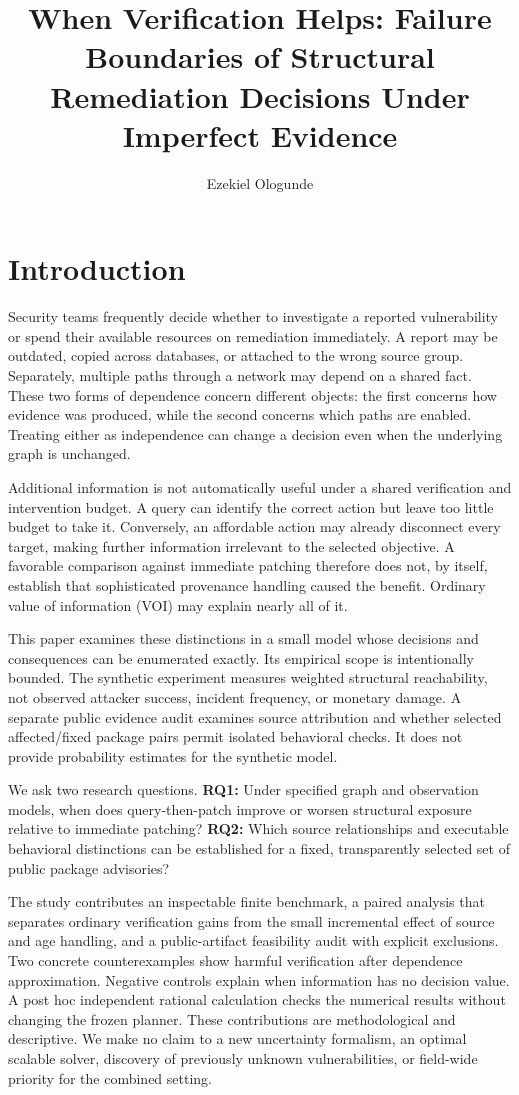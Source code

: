 \documentclass[manuscript,screen,nonacm]{acmart}
\title{When Verification Helps: Failure Boundaries of Structural Remediation Decisions Under Imperfect Evidence}
\author{Ezekiel Ologunde}
\affiliation[obeypunctuation=true]{\institution{Independent Researcher}\country{}}
\begin{document}
\maketitle

\section{Introduction}
Security teams frequently decide whether to investigate a reported vulnerability or spend their available resources on remediation immediately. A report may be outdated, copied across databases, or attached to the wrong source group. Separately, multiple paths through a network may depend on a shared fact. These two forms of dependence concern different objects: the first concerns how evidence was produced, while the second concerns which paths are enabled. Treating either as independence can change a decision even when the underlying graph is unchanged.

Additional information is not automatically useful under a shared verification and intervention budget. A query can identify the correct action but leave too little budget to take it. Conversely, an affordable action may already disconnect every target, making further information irrelevant to the selected objective. A favorable comparison against immediate patching therefore does not, by itself, establish that sophisticated provenance handling caused the benefit. Ordinary value of information (VOI) may explain nearly all of it.

This paper examines these distinctions in a small model whose decisions and consequences can be enumerated exactly. Its empirical scope is intentionally bounded. The synthetic experiment measures weighted structural reachability, not observed attacker success, incident frequency, or monetary damage. A separate public evidence audit examines source attribution and whether selected affected/fixed package pairs permit isolated behavioral checks. It does not provide probability estimates for the synthetic model.

We ask two research questions. \textbf{RQ1:} Under specified graph and observation models, when does query-then-patch improve or worsen structural exposure relative to immediate patching? \textbf{RQ2:} Which source relationships and executable behavioral distinctions can be established for a fixed, transparently selected set of public package advisories?

The study contributes an inspectable finite benchmark, a paired analysis that separates ordinary verification gains from the small incremental effect of source and age handling, and a public-artifact feasibility audit with explicit exclusions. Two concrete counterexamples show harmful verification after dependence approximation. Negative controls explain when information has no decision value. A post hoc independent rational calculation checks the numerical results without changing the frozen planner. These contributions are methodological and descriptive. We make no claim to a new uncertainty formalism, an optimal scalable solver, discovery of previously unknown vulnerabilities, or field-wide priority for the combined setting.
\end{document}
